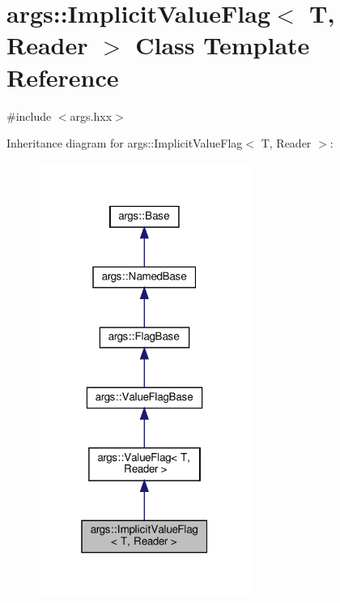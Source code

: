 \hypertarget{classargs_1_1_implicit_value_flag}{}\section{args\+:\+:Implicit\+Value\+Flag$<$ T, Reader $>$ Class Template Reference}
\label{classargs_1_1_implicit_value_flag}


{\ttfamily \#include $<$args.\+hxx$>$}



Inheritance diagram for args\+:\+:Implicit\+Value\+Flag$<$ T, Reader $>$\+:\nopagebreak
\begin{figure}[H]
\begin{center}
\leavevmode
\includegraphics[width=196pt]{classargs_1_1_implicit_value_flag__inherit__graph}
\end{center}
\end{figure}


